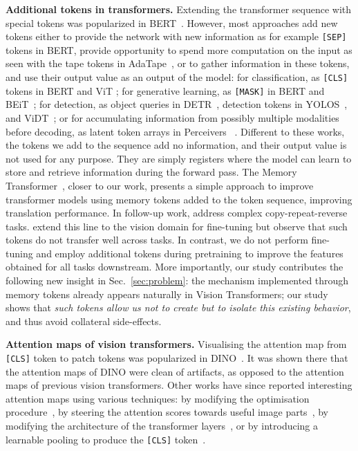 \documentclass{article} \usepackage{iclr2024_conference,times}
\begin{document}
\textbf{Additional tokens in transformers.}
Extending the transformer sequence with special tokens was popularized in BERT~\citep{devlin2018bert}. 
However, most approaches add new tokens either to provide the network with new information as for example \texttt{[SEP]} tokens in BERT, provide opportunity to spend more computation on the input as seen with the tape tokens in AdaTape~\citep{xue2023adaptive}, or to gather information in these tokens, and use their output value as an output of the model:
for classification, as \texttt{[CLS]} tokens in BERT and ViT \citep{dosovitskiy2020image};
for generative learning, as \texttt{[MASK]} in BERT and BEiT~\citep{bao2021beit};
for detection, as object queries in DETR~\citep{carion2020end}, detection tokens in YOLOS~\citep{fang2021you}, and ViDT~\citep{song2021vidt};
or for accumulating information from possibly multiple modalities before decoding, as latent token arrays in Perceivers ~\citep{jaegle2021perceiver,Jaegle2021PerceiverIO}.
Different to these works, the tokens we add to the sequence add no information, and their output value is not used for any purpose. 
They are simply registers where the model can learn to store and retrieve information during the forward pass.
The Memory Transformer~\citep{burtsev2020memory}, closer to our work, presents a simple approach to improve transformer models using memory tokens added to the token sequence, improving translation performance. 
In follow-up work, \cite{bulatov2022recurrent} address complex copy-repeat-reverse tasks. 
\cite{sandler2022fine} extend this line to the vision domain for fine-tuning but observe that such tokens do not transfer well across tasks.
In contrast, we do not perform fine-tuning and employ additional tokens during pretraining to improve the features obtained for all tasks downstream.
More importantly, our study contributes the following new insight in Sec.~\ref{sec:problem}: the mechanism implemented through memory tokens already appears naturally in Vision Transformers; our study shows that \textit{such tokens allow us not to create but to isolate this existing behavior}, and thus avoid collateral side-effects.

\textbf{Attention maps of vision transformers.}
Visualising the attention map from \texttt{[CLS]} token to patch tokens was popularized in DINO~\citep{caron2021emerging}.
It was shown there that the attention maps of DINO were clean of artifacts, as opposed to the attention maps of previous vision transformers.
Other works have since reported interesting attention maps using various techniques: by modifying the optimisation procedure~\citep{chen2021vision}, by steering the attention scores towards useful image parts~\citep{shi2023toast}, by modifying the architecture of the transformer layers~\citep{yu2023emergence}, or by introducing a learnable pooling to produce the \texttt{[CLS]} token~\citep{psomas2023keep}. 
\end{document}
